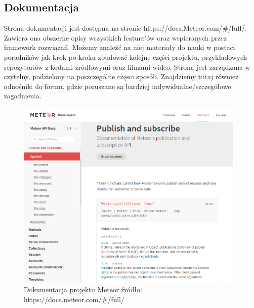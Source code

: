 \documentclass[12pt]{report}
\begin{document}
    \subsection{Dokumentacja}
      Strona dokumentacji jest dostępna na stronie https://docs.Meteor.com/\#/full/.
      Zawiera ona obszerne opisy wszystkich feature'ów oraz wspieranych przez framework rozwiązań.
      Możemy znaleźć na niej materiały do nauki w postaci poradników jak krok po kroku zbudować kolejne części projektu, przykładowych repozytoriów z kodami źródłowymi oraz filmami wideo.
      Strona jest zarządzana w czytelny, podzielony na poszczególne częsci sposób.
      Znajdziemy tutaj również odnośniki do forum, gdzie poruszane są bardziej indywidualne/szczegółowe zagadnienia.
      \begin{figure}[!hb]
        \centering
        \includegraphics[width=\textwidth,height=\textheight,keepaspectratio]{doc_meteor.png} 
        \caption{Dokumentacja projektu Meteor \newline źródło: https://docs.meteor.com/\#/full/}
      \end{figure}
\end{document}
